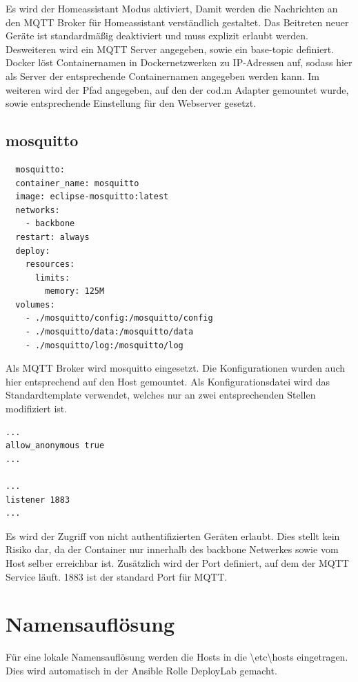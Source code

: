 Es wird der \grqq Homeassistant\grqq{} Modus aktiviert, Damit werden die Nachrichten an den MQTT Broker für Homeassistant verständlich gestaltet.
Das Beitreten neuer Geräte ist standardmäßig deaktiviert und muss explizit erlaubt werden. Desweiteren wird ein MQTT Server angegeben, sowie ein \grqq base-topic\grqq{}
definiert. Docker löst Containernamen in Dockernetzwerken zu IP-Adressen auf, sodass hier als Server der entsprechende Containernamen angegeben werden
kann. Im weiteren wird der Pfad angegeben, auf den der cod.m Adapter gemountet wurde, sowie entsprechende Einstellung für den Webserver gesetzt.

\subsection{mosquitto}

\begin{lstlisting}
  mosquitto:
  container_name: mosquitto
  image: eclipse-mosquitto:latest
  networks:
    - backbone
  restart: always
  deploy:
    resources:
      limits:
        memory: 125M
  volumes:
    - ./mosquitto/config:/mosquitto/config
    - ./mosquitto/data:/mosquitto/data
    - ./mosquitto/log:/mosquitto/log
\end{lstlisting}

Als MQTT Broker wird \grqq mosquitto\grqq{} eingesetzt. Die Konfigurationen 
wurden auch hier entsprechend auf den Host gemountet. Als Konfigurationsdatei wird das Standardtemplate verwendet, welches nur an zwei 
entsprechenden Stellen modifiziert ist.

\begin{lstlisting}
... 
allow_anonymous true
... 

... 
listener 1883
... 
\end{lstlisting}

Es wird der Zugriff von nicht authentifizierten Geräten erlaubt. Dies stellt kein Risiko dar, da der Container nur innerhalb des \grqq backbone\grqq{} 
Netwerkes sowie vom Host selber erreichbar ist. Zusätzlich wird der Port definiert, auf dem der MQTT Service läuft. 1883 ist der standard Port für MQTT.

\section{Namensauflösung}

Für eine lokale Namensauflösung werden die Hosts in die \grqq \textbackslash etc\textbackslash hosts\grqq{} eingetragen. Dies wird automatisch in der Ansible
Rolle \grqq DeployLab\grqq{} gemacht.

